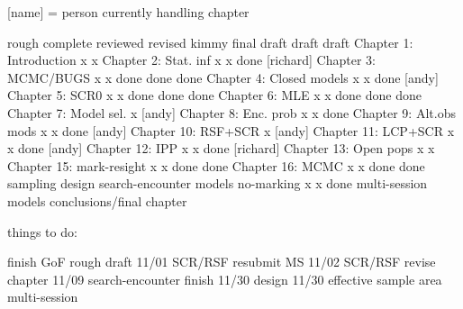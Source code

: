 [name] = person currently handling chapter


                          rough   complete reviewed  revised kimmy  final draft
                          draft    draft
Chapter 1: Introduction       x       x
Chapter 2: Stat. inf          x       x     done    [richard]
Chapter 3: MCMC/BUGS          x       x     done     done    done
Chapter 4: Closed models      x       x     done    [andy]
Chapter 5: SCR0               x       x     done     done    done
Chapter 6: MLE                x       x     done     done    done
Chapter 7: Model sel.         x     [andy]
Chapter 8: Enc. prob          x       x     done
Chapter 9: Alt.obs mods       x       x     done    [andy] 
Chapter 10: RSF+SCR           x    [andy]
Chapter 11: LCP+SCR           x       x     done    [andy]
Chapter 12: IPP               x       x     done    [richard]
Chapter 13: Open pops         x       x
Chapter 15: mark-resight      x       x     done     done 
Chapter 16: MCMC              x       x     done     done
sampling design     
search-encounter models
no-marking                    x       x     done
multi-session models
conclusions/final chapter





things to do:

finish GoF rough draft   11/01
SCR/RSF resubmit MS      11/02
SCR/RSF revise chapter   11/09
search-encounter finish  11/30
design                   11/30
effective sample area  
multi-session
